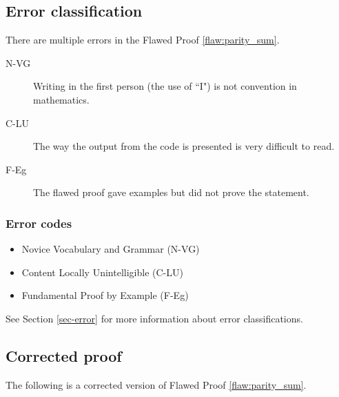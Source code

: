 \clearpage
\subsection{Error classification}


There are multiple errors
 in the Flawed Proof \ref{flaw:parity_sum}. 
 
 \begin{description}
    \item[N-VG] Writing in the first person (the use of ``I") is not convention in mathematics. 
    \item[C-LU] The way the output from the code is presented is very difficult to read. 
    \item[F-Eg] The flawed proof gave examples but did not prove the statement. 

 	
 \end{description}

 
\subsubsection{Error codes}
\begin{itemize}
    \item Novice Vocabulary and Grammar (N-VG)
    \item Content Locally Unintelligible (C-LU)
    \item Fundamental Proof by Example (F-Eg)
\end{itemize}
See Section \ref{sec-error} for more information about error classifications.

\clearpage
\subsection{Corrected proof}

The following is a corrected version of Flawed Proof \ref{flaw:parity_sum}. %

